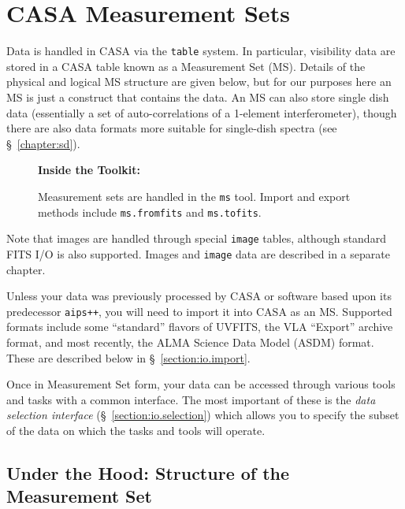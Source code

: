 \section{CASA Measurement Sets}
\label{section:io.ms}

Data is handled in CASA via the {\tt table} system.  In particular,
visibility data are stored in a CASA table known as a Measurement Set
(MS).  Details of the physical and logical MS structure are given
below, but for our purposes here an MS is just a construct that
contains the data.  An MS can also store single dish data (essentially
a set of auto-correlations of a 1-element interferometer), though
there are also data formats more suitable for single-dish spectra (see
\S~\ref{chapter:sd}).

\begin{wrapfigure}{r}{2.5in}
  \begin{boxedminipage}{2.5in}
     \centerline{\bf Inside the Toolkit:}
     Measurement sets are handled in the {\tt ms} tool.
     Import and export methods include {\tt ms.fromfits} and
     {\tt ms.tofits}.
  \end{boxedminipage}
\end{wrapfigure}

Note that images are handled through special
{\tt image} tables, although standard FITS I/O is also supported.
Images and {\tt image} data are described in a separate chapter.

Unless your data was previously processed by CASA or software based
upon its predecessor {\tt aips++}, you will need to import it into
CASA as an MS.  Supported formats include some ``standard'' flavors
of UVFITS, the VLA ``Export'' archive format, and most recently,
the ALMA Science Data Model (ASDM) format.  These are described below
in \S~\ref{section:io.import}.

Once in Measurement Set form, your data can be accessed through various tools
and tasks with a common interface.  The most important of these is the {\em
data selection interface} (\S~\ref{section:io.selection}) which allows you to
specify the subset of the data on which the tasks and tools will
operate.


\subsection{Under the Hood: Structure of the Measurement Set}
\label{section:io.ms.structure}

